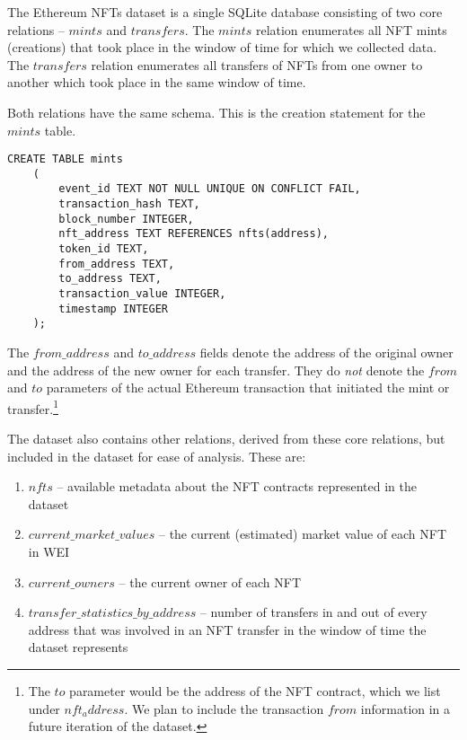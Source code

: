 \documentclass{article}
\begin{document}
The Ethereum NFTs dataset is a single SQLite database consisting of two core relations -- $mints$ and $transfers$. The $mints$ relation enumerates all NFT mints (creations) that took place in the window of time for which we collected data. The $transfers$ relation enumerates all transfers of NFTs from one owner to another which took place in the same window of time.

Both relations have the same schema. This is the creation statement for the $mints$ table.

\begin{lstlisting}[caption={$mints$ relation}]
CREATE TABLE mints
    (
        event_id TEXT NOT NULL UNIQUE ON CONFLICT FAIL,
        transaction_hash TEXT,
        block_number INTEGER,
        nft_address TEXT REFERENCES nfts(address),
        token_id TEXT,
        from_address TEXT,
        to_address TEXT,
        transaction_value INTEGER,
        timestamp INTEGER
    );
\end{lstlisting}

The $from\_address$ and $to\_address$ fields denote the address of the original owner and the address of the new owner for each transfer. They do \emph{not} denote the $from$ and $to$ parameters of the actual Ethereum transaction that initiated the mint or transfer.\footnote{The $to$ parameter would be the address of the NFT contract, which we list under $nft_address$. We plan to include the transaction $from$ information in a future iteration of the dataset.}

The dataset also contains other relations, derived from these core relations, but included in the dataset for ease of analysis. These are:

\begin{enumerate}

\item{$nfts$ -- available metadata about the NFT contracts represented in the dataset}

\item{$current\_market\_values$ -- the current (estimated) market value of each NFT in WEI}

\item{$current\_owners$ -- the current owner of each NFT}

\item{$transfer\_statistics\_by\_address$ -- number of transfers in and out of every address that was involved in an NFT transfer in the window of time the dataset represents}

\end{enumerate}
\end{document}
